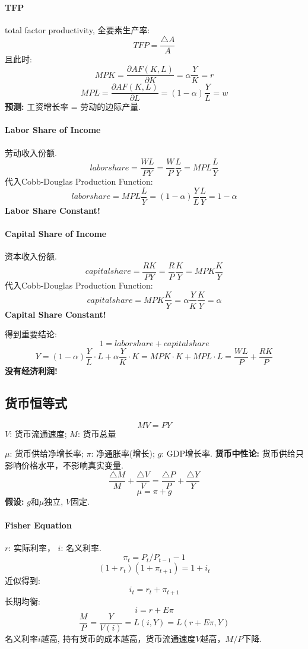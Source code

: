 \documentclass[UTF8, onecolumn, a4paper, 12pt]{article}
\begin{document}
\paragraph{TFP}total factor productivity, 全要素生产率:
$$TFP = \frac{\triangle A}{A}$$
且此时:
$$MPK = \frac{\partial AF(K,L)}{\partial K} = \alpha\frac{Y}{K} = r$$
$$MPL = \frac{\partial AF(K,L)}{\partial L} = (1-\alpha)\frac{Y}{L} = w$$
\textbf{预测:} 工资增长率 = 劳动的边际产量.
\paragraph{Labor Share of Income}
劳动收入份额. 
$$laborshare = \frac{WL}{PY} = \frac{W}{P}\frac{L}{Y} = MPL\frac{L}{Y}$$
代入Cobb-Douglas Production Function:
$$laborshare = MPL\frac{L}{Y} = (1-\alpha)\frac{Y}{L}\frac{L}{Y} = 1 - \alpha$$
\textbf{Labor Share Constant!}
\paragraph{Capital Share of Income}
资本收入份额. 
$$capitalshare = \frac{RK}{PY} = \frac{R}{P}\frac{K}{Y} = MPK\frac{K}{Y}$$
代入Cobb-Douglas Production Function:
$$capitalshare = MPK\frac{K}{Y} = \alpha\frac{Y}{K}\frac{K}{Y} = \alpha$$
\textbf{Capital Share Constant!}

得到重要结论:
$$1 = laborshare + capitalshare$$
$$Y = (1-\alpha)\frac{Y}{L}\cdot L + \alpha\frac{Y}{K}\cdot K = MPK\cdot K + MPL\cdot L = \frac{WL}{P} + \frac{RK}{P}$$
\textbf{没有经济利润!}
\subsection{货币恒等式}
$$MV = PY$$
$V$: 货币流通速度; $M$: 货币总量

$\mu$: 货币供给净增长率; $\pi$: 净通胀率(增长); $g$: GDP增长率.
\textbf{货币中性论:} 货币供给只影响价格水平，不影响真实变量.
$$\frac{\triangle M}{M} + \frac{\triangle V}{V} = \frac{\triangle P}{P} + \frac{\triangle Y}{Y}$$
$$\mu = \pi + g$$
\textbf{假设:} $g$和$\mu$独立, $V$固定.

\paragraph{Fisher Equation}
$r$: 实际利率， $i$: 名义利率.
$$\pi_{t} = P_{t}/P_{t-1}  - 1$$
$$(1 + r_t)(1+\pi_{t+1}) = 1+i_t$$
近似得到:
$$i_t = r_t + \pi_{t+1}$$
长期均衡:
$$i = r + E\pi$$
$$\frac{M}{P} = \frac{Y}{V(i)} = L(i, Y) = L(r + E\pi, Y)$$
名义利率$i$越高, 持有货币的成本越高，货币流通速度$V$越高，$M/P$下降.
\end{document}
